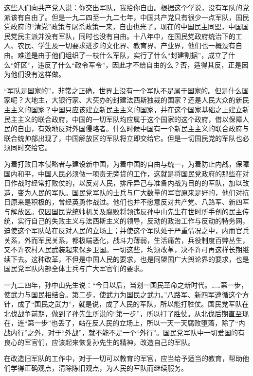 这些人们向共产党人说：你交出军队，我给你自由。根据这个学说，没有军队的党派该有自由了。但是一九二四至一九二七年，中国共产党只有很少一点军队，国民党政府的“清党”政策与屠杀政策一来，自由也光了。现在的中国民主同盟，中国国民党民主派并没有军队，同时也没有自由。十八年中，在国民党政府统治下的工人、农民、学生及一切要求进步的文化界、教育界、产业界，他们也一概没有自由。难道是由于他们组织了一枝什么军队，实行了什么“封建割据”，成立了什么“奸区”，违反了什么“政令军令”，因此才不给自由的么？否，适得其反，正是因为他们没有这样做。

“军队是国家的”，非常之正确，世界上没有一个军队不是属于国家的。但是什么国家呢？大地主，大银行家、大买办的封建法西斯独裁的国家？还是人民大众的新民主主义的国家？中国只应该建立新民主主义的国家，并在这个国家基础之上建立新民主主义的联合政府，中国的一切军队均应属于这个国家的这个政府，借以保障人民的自由，有效地反对外国侵略者。什么时候中国有一个新民主主义的联合政府与联合统帅部出现了，中国解放区的军队将立即交给它。但是一切国民党的军队也必须同时交给它。

为着打败日本侵略者与建设新中国，为着中国的自由与统一，为着防止内战，保障国内和平，中国人民必须做一项责无旁贷的工作，这就是将国民党政府的那些在对日作战时经常打败仗的，以反对人民，排斥异己与准备内战为目的的军队，加以改造，变为人民的军队。国民党军队的士兵与广大数量的军官原来是好的，他们对抗日原来是积极的，曾经英勇作战过。他们也并不愿意反对共产党、八路军、新四军与解放区。仅因国民党统帅机关及腐败将领违反孙中山先生在世时所手创的民主传统，实行自己的失败主义与法西斯主义的领导，反动的政治工作与反动的特务网，迫使这个军队站在反对人民的立场上；并使这个军队处于严重情况之中，内而官兵关系，外而军民关系，都极端恶化，战斗力薄弱，生活痛苦，兵役制度百弊丛生，又不许农村人民武装起来保乡卫国。一切这些，均须改革，决不许可再这样长期继续下去。这种改革，不但是中国人民的要求，也是同盟国广大舆论界的要求，也是国民党军队内部全体士兵与广大军官们的要求。

一九二四年，孙中山先生说：“今日以后，当划一国民革命之新时代。……第一步，使武力与国民相结合。第二步，使武力为国民之武力。”八路军、新四军遵循这个方针，成了“国民之武力”，就是说，成了人民的军队，所以能打胜仗。国民党军队在北伐战争前期，做到了孙先生所说的“第一步”，所以打了胜仗。从北伐后期直至现在，连“第一步”也丢了，站在反人民的立场上，所以一天一天腐败堕落，除了“内战内行”之外，对于“外战”，就不能不是一个“外行”。国民党军队中一切爱国的有良心的军官们，应该起来恢复孙先生的精神，改造自己的军队。

在改造旧军队的工作中，对于一切可以教育的军官，应当给予适当的教育，帮助他们学得正确观点，清除陈旧观点，为人民的军队而继续服务。

